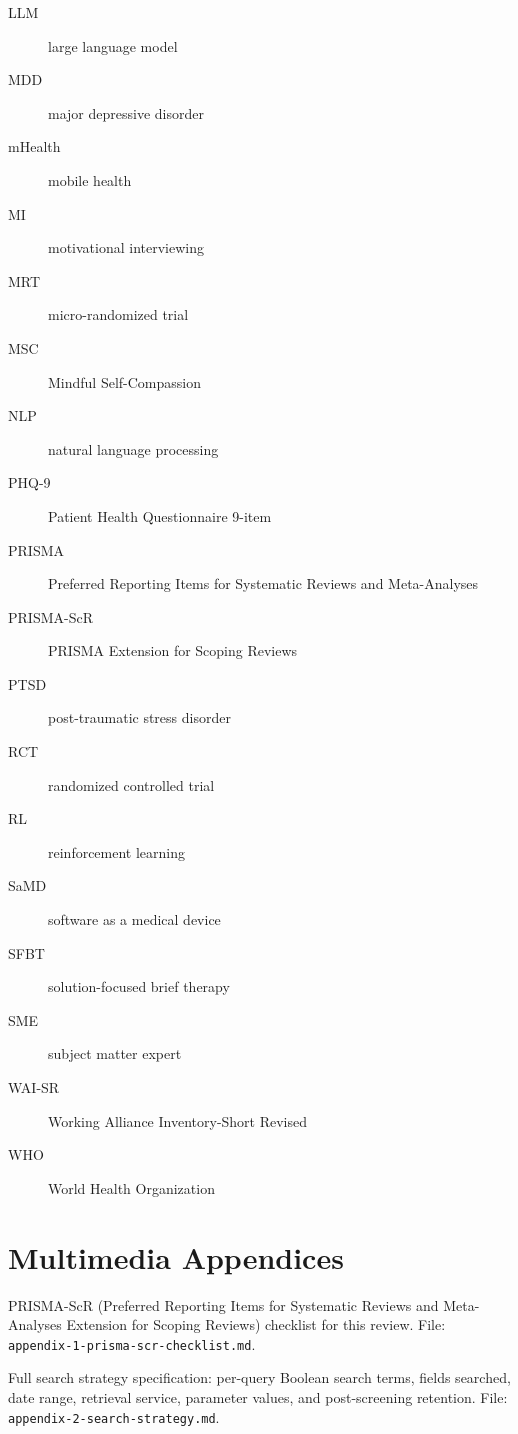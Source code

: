 \documentclass[11pt,a4paper]{article}
\begin{document}
\begin{description}
  \item[LLM] large language model
  \item[MDD] major depressive disorder
  \item[mHealth] mobile health
  \item[MI] motivational interviewing
  \item[MRT] micro-randomized trial
  \item[MSC] Mindful Self-Compassion
  \item[NLP] natural language processing
  \item[PHQ-9] Patient Health Questionnaire 9-item
  \item[PRISMA] Preferred Reporting Items for Systematic Reviews and Meta-Analyses
  \item[PRISMA-ScR] PRISMA Extension for Scoping Reviews
  \item[PTSD] post-traumatic stress disorder
  \item[RCT] randomized controlled trial
  \item[RL] reinforcement learning
  \item[SaMD] software as a medical device
  \item[SFBT] solution-focused brief therapy
  \item[SME] subject matter expert
  \item[WAI-SR] Working Alliance Inventory-Short Revised
  \item[WHO] World Health Organization
\end{description}

\section*{Multimedia Appendices}\label{sec:multimedia}
\begin{description}\setlength{\itemsep}{0pt}
  \item[\textbf{Multimedia Appendix 1.}] PRISMA-ScR (Preferred Reporting
    Items for Systematic Reviews and Meta-Analyses Extension for
    Scoping Reviews) checklist for this review. File:
    \texttt{appendix-1-prisma-scr-checklist.md}.
  \item[\textbf{Multimedia Appendix 2.}] Full search strategy
    specification: per-query Boolean search terms, fields searched,
    date range, retrieval service, parameter values, and
    post-screening retention. File:
    \texttt{appendix-2-search-strategy.md}.
\end{description}

\end{document}
